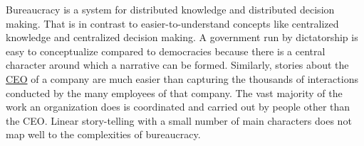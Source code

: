 Bureaucracy is a system for distributed knowledge and distributed decision making. 
That is in contrast to easier-to-understand concepts like centralized knowledge and centralized decision making. A government run by dictatorship is easy to conceptualize compared to democracies because there is a central character around which a narrative can be formed. Similarly, stories about the \href{https://en.wikipedia.org/wiki/Chief_executive_officer}{CEO} of a company are much easier than capturing the thousands of interactions conducted by the many employees of that company. The vast majority of the work an organization does is coordinated and carried out by people other than the CEO. Linear story-telling with a small number of main characters does not map well to the complexities of bureaucracy. 


